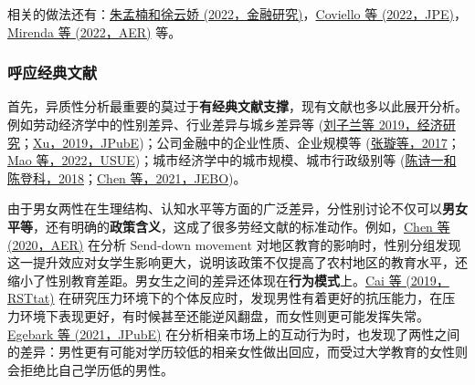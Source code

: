 \documentclass[11pt,a4paper]{ctexart}
\begin{document}
相关的做法还有：\href{http://www.jryj.org.cn/CN/abstract/abstract1125.shtml}{朱孟楠和徐云娇
(2022，金融研究)}，\href{https://www.journals.uchicago.edu/doi/ftextbfl/10.1086/720397}{Coviello
等
(2022，JPE)}，\href{https://www.aeaweb.org/doi/10.1257/aer.20201015}{Mirenda
等 (2022，AER)} 等。

\subsubsection{呼应经典文献}

首先，异质性分析最重要的莫过于\textbf{有经典文献支撑}，现有文献也多以此展开分析。例如劳动经济学中的性别差异、行业差异与城乡差异等
(\href{https://t.cnki.net/kcms/detail?v=3uoqIhG8C44YLTlOAiTRKibYlV5Vjs7iLik5jEcCI09uHa3oBxtWoHGwy9XepWzLa7hTnMdFB72E5-WmbJIPU_eSgUZiuFCB&uniplatform=NZKPT}{刘子兰等
2019，经济研究}；\href{https://doi.org/10.1016/j.jpubeco.2021.104492}{Xu，2019，JPubE})；公司金融中的企业性质、企业规模等
(\href{https://t.cnki.net/kcms/detail?v=3uoqIhG8C44YLTlOAiTRKibYlV5Vjs7iAEhECQAQ9aTiC5BjCgn0Rv4-PadGuYKxVvdrFbu9R9xAX4mYZqyy-aN0NNSkHOoo&uniplatform=NZKPT}{张璇等，2017}；\href{https://www.sciencedirect.com/science/article/pii/S0166046222000898?casa_token=cpCUnYcqVisAAAAA:aUtmewxVkruyOc2rttWy3_sy9IqKWVQyC20YRtvJ7qWrR1CxWk9LSJf8FXUuJ2uqr1ayFgR7Wg}{Mao
等，2022，USUE})；城市经济学中的城市规模、城市行政级别等
(\href{https://t.cnki.net/kcms/detail?v=3uoqIhG8C44YLTlOAiTRKibYlV5Vjs7i0-kJR0HYBJ80QN9L51zrPzWAZGIoVH-LCfNR-niuNYvs9i6nTZWNl6mqAunxXRKS&uniplatform=NZKPT}{陈诗一和陈登科，2018}；\href{https://doi.org/10.1016/j.jebo.2020.12.002}{Chen
等，2021，JEBO})。

由于男女两性在生理结构、认知水平等方面的广泛差异，分性别讨论不仅可以\textbf{男女平等}，还有明确的\textbf{政策含义}，这成了很多劳经文献的标准动作。例如，\href{https://www.aeaweb.org/articles?id=10.1257/aer.20191414}{Chen
等 (2020，AER)} 在分析 Send-down movement
对地区教育的影响时，性别分组发现这一提升效应对女学生影响更大，说明该政策不仅提高了农村地区的教育水平，还缩小了性别教育差距。男女生之间的差异还体现在\textbf{行为模式}上。\href{https://doi.org/10.1162/rest_a_00749}{Cai
等 (2019，RSTtat)}
在研究压力环境下的个体反应时，发现男性有着更好的抗压能力，在压力环境下表现更好，有时候甚至还能逆风翻盘，而女性则更可能发挥失常。\href{https://doi.org/10.1016/j.jpubeco.2021.104372}{Egebark
等 (2021，JPubE)}
在分析相亲市场上的互动行为时，也发现了两性之间的差异：男性更有可能对学历较低的相亲女性做出回应，而受过大学教育的女性则会拒绝比自己学历低的男性。
\end{document}
